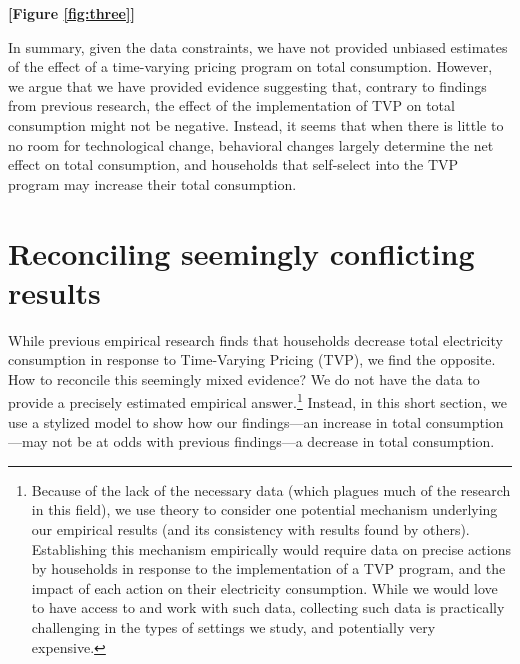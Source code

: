 \documentclass[12pt]{article}
\begin{document}
\centerline{\textbf{[Figure \ref{fig:three}]}}


In summary, given the data constraints, we have not provided unbiased estimates of the effect of a time-varying pricing program on total consumption. However, we argue that we have provided evidence suggesting that, contrary to findings from previous research, the effect of the implementation of TVP on total consumption might not be negative. Instead, it seems that when there is little to no room for technological change, behavioral changes largely determine the net effect on total consumption, and households that self-select into the TVP program may increase their total consumption.

\section{Reconciling seemingly conflicting results}

While previous empirical research finds that households decrease total electricity consumption in response to Time-Varying Pricing (TVP), we find the opposite. How to reconcile this seemingly mixed evidence? We do not have the data to provide a precisely estimated empirical answer.\footnote{Because of the lack of the necessary data (which plagues much of the research in this field), we use theory to consider one potential mechanism underlying our empirical results (and its consistency with results found by others). Establishing this mechanism empirically would require data on precise actions by households in response to the implementation of a TVP program, and the impact of each action on their electricity consumption. While we would love to have access to and work with such data, collecting such data is practically challenging in the types of settings we study, and potentially very expensive.} Instead, in this short section, we use a stylized model to show how our findings---an increase in total consumption---may not be at odds with previous findings---a decrease in total consumption.
\end{document}
